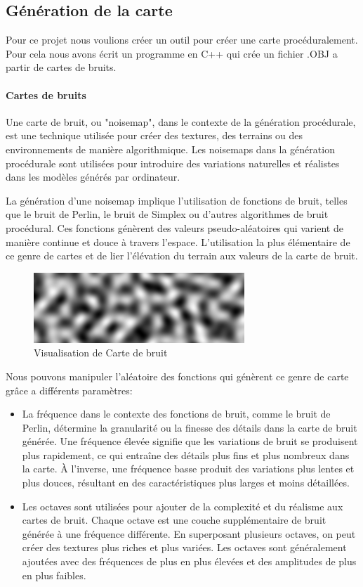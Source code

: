 

\subsection{Génération de la carte}
    Pour ce projet nous voulions créer un outil pour créer une carte procéduralement. Pour cela nous avons écrit un programme en C++ qui crée un fichier .OBJ a partir de cartes de bruits.
    \paragraph{Cartes de bruits}
    Une carte de bruit, ou "noisemap", dans le contexte de la génération procédurale, est une technique utilisée pour créer des textures, des terrains ou des environnements de manière algorithmique. Les noisemaps dans la génération procédurale sont utilisées pour introduire des variations naturelles et réalistes dans les modèles générés par ordinateur.\cite{CreateTerrain}
    
    La génération d'une noisemap implique l'utilisation de fonctions de bruit, telles que le bruit de Perlin, le bruit de Simplex ou d'autres algorithmes de bruit procédural. Ces fonctions génèrent des valeurs pseudo-aléatoires qui varient de manière continue et douce à travers l'espace. L'utilisation la plus élémentaire de ce genre de cartes et de lier l'élévation du terrain aux valeurs de la carte de bruit.

    \begin{figure}[!h]
        \centering
            \includegraphics[width=0.5\linewidth]{images/render-noise.png}
            \caption{Visualisation de Carte de bruit}
            \label{fig:enter-label}
    \end{figure}

    Nous pouvons manipuler l'aléatoire des fonctions qui génèrent ce genre de carte grâce a différents paramètres:
    \begin{itemize}
        \item La fréquence dans le contexte des fonctions de bruit, comme le bruit de Perlin, détermine la granularité ou la finesse des détails dans la carte de bruit générée. Une fréquence élevée signifie que les variations de bruit se produisent plus rapidement, ce qui entraîne des détails plus fins et plus nombreux dans la carte. À l'inverse, une fréquence basse produit des variations plus lentes et plus douces, résultant en des caractéristiques plus larges et moins détaillées.
        \item Les octaves sont utilisées pour ajouter de la complexité et du réalisme aux cartes de bruit. Chaque octave est une couche supplémentaire de bruit générée à une fréquence différente. En superposant plusieurs octaves, on peut créer des textures plus riches et plus variées. Les octaves sont généralement ajoutées avec des fréquences de plus en plus élevées et des amplitudes de plus en plus faibles.
    \end{itemize}

